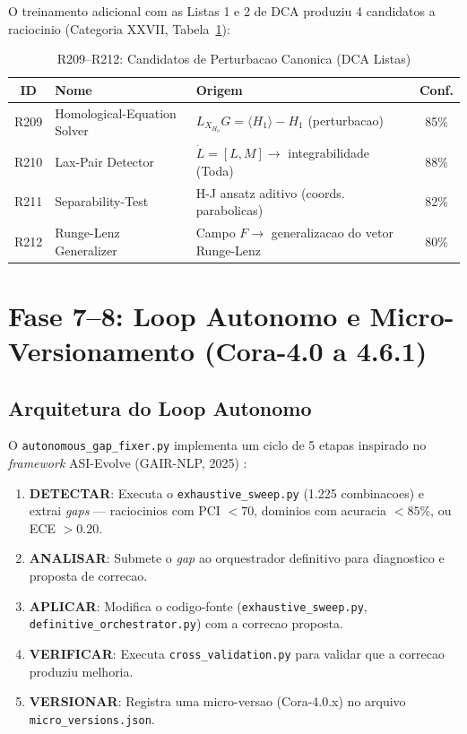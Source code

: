 \documentclass[5p]{elsarticle}
\newcommand{\tabfootnotesize}{\fontsize{9}{11}\selectfont}
\begin{document}
O treinamento adicional com as Listas 1 e 2 de DCA produziu 4 candidatos a raciocinio
(Categoria XXVII, Tabela~\ref{tab:r209}):

\begin{table}[H]
\centering
\caption{R209--R212: Candidatos de Perturbacao Canonica (DCA Listas)}
\label{tab:r209}
\tabfootnotesize
\begin{tabular}{c p{3.5cm} p{5cm} c}
\toprule
\textbf{ID} & \textbf{Nome} & \textbf{Origem} & \textbf{Conf.}\\
\midrule
R209 & Homological-Equation Solver & $L_{X_{H_0}}G = \langle H_1\rangle - H_1$ (perturbacao) & 85\%\\
R210 & Lax-Pair Detector & $\dot{L} = [L, M] \to$ integrabilidade (Toda) & 88\%\\
R211 & Separability-Test & H-J ansatz aditivo (coords. parabolicas) & 82\%\\
R212 & Runge-Lenz Generalizer & Campo $F \to$ generalizacao do vetor Runge-Lenz & 80\%\\
\bottomrule
\end{tabular}
\end{table}

\section{Fase 7--8: Loop Autonomo e Micro-Versionamento (Cora-4.0 a 4.6.1)}

\subsection{Arquitetura do Loop Autonomo}

O \texttt{autonomous\_gap\_fixer.py} implementa um ciclo de 5 etapas inspirado
no \textit{framework} ASI-Evolve (GAIR-NLP, 2025) \cite{asievolve2025}:

\begin{enumerate}[label=\textbf{Etapa \arabic*:}]
  \item \textbf{DETECTAR}: Executa o \texttt{exhaustive\_sweep.py} (1.225
        combinacoes) e extrai \textit{gaps} --- raciocinios com PCI $< 70$,
        dominios com acuracia $< 85\%$, ou ECE $> 0.20$.
  \item \textbf{ANALISAR}: Submete o \textit{gap} ao orquestrador definitivo
        para diagnostico e proposta de correcao.
  \item \textbf{APLICAR}: Modifica o codigo-fonte (\texttt{exhaustive\_sweep.py},
        \texttt{definitive\_orchestrator.py}) com a correcao proposta.
  \item \textbf{VERIFICAR}: Executa \texttt{cross\_validation.py} para validar
        que a correcao produziu melhoria.
  \item \textbf{VERSIONAR}: Registra uma micro-versao (Cora-4.0.x) no arquivo
        \texttt{micro\_versions.json}.
\end{enumerate}
\end{document}
